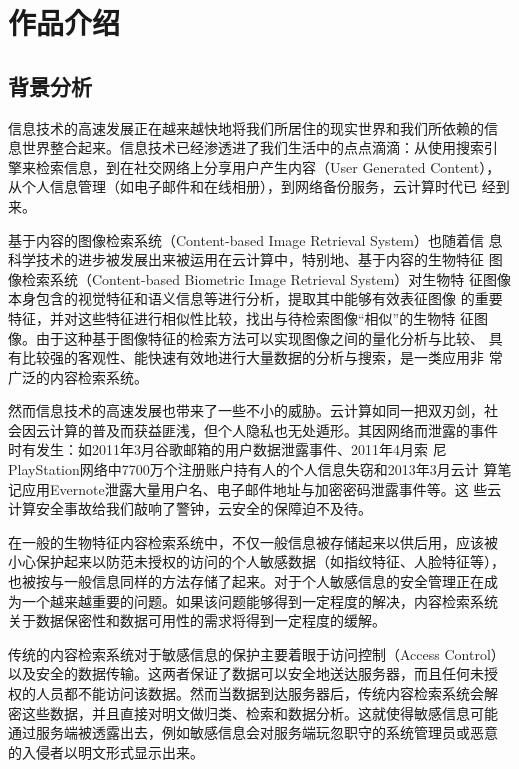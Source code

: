 
\chapter{作品介绍}
\label{chap:intro}

\section{背景分析}
\label{sec:bkg-analysis}

信息技术的高速发展正在越来越快地将我们所居住的现实世界和我们所依赖的信
息世界整合起来。信息技术已经渗透进了我们生活中的点点滴滴：从使用搜索引
擎来检索信息，到在社交网络上分享用户产生内容（User Generated Content），
从个人信息管理（如电子邮件和在线相册），到网络备份服务，云计算时代已
经到来。

基于内容的图像检索系统（Content-based Image Retrieval System）也随着信
息科学技术的进步被发展出来被运用在云计算中，特别地、基于内容的生物特征
图像检索系统（Content-based Biometric Image Retrieval System）对生物特
征图像本身包含的视觉特征和语义信息等进行分析，提取其中能够有效表征图像
的重要特征，并对这些特征进行相似性比较，找出与待检索图像“相似”的生物特
征图像。由于这种基于图像特征的检索方法可以实现图像之间的量化分析与比较、
具有比较强的客观性、能快速有效地进行大量数据的分析与搜索，是一类应用非
常广泛的内容检索系统。

然而信息技术的高速发展也带来了一些不小的威胁。云计算如同一把双刃剑，社
会因云计算的普及而获益匪浅，但个人隐私也无处遁形。其因网络而泄露的事件
时有发生：如2011年3月谷歌邮箱的用户数据泄露事件、2011年4月索
尼PlayStation网络中7700万个注册账户持有人的个人信息失窃和2013年3月云计
算笔记应用Evernote泄露大量用户名、电子邮件地址与加密密码泄露事件等。这
些云计算安全事故给我们敲响了警钟，云安全的保障迫不及待。

在一般的生物特征内容检索系统中，不仅一般信息被存储起来以供后用，应该被
小心保护起来以防范未授权的访问的个人敏感数据（如指纹特征、人脸特征等），
也被按与一般信息同样的方法存储了起来。对于个人敏感信息的安全管理正在成
为一个越来越重要的问题。如果该问题能够得到一定程度的解决，内容检索系统
关于数据保密性和数据可用性的需求将得到一定程度的缓解。

传统的内容检索系统对于敏感信息的保护主要着眼于访问控制（Access Control）
以及安全的数据传输。这两者保证了数据可以安全地送达服务器，而且任何未授
权的人员都不能访问该数据。然而当数据到达服务器后，传统内容检索系统会解
密这些数据，并且直接对明文做归类、检索和数据分析。这就使得敏感信息可能
通过服务端被透露出去，例如敏感信息会对服务端玩忽职守的系统管理员或恶意
的入侵者以明文形式显示出来。

